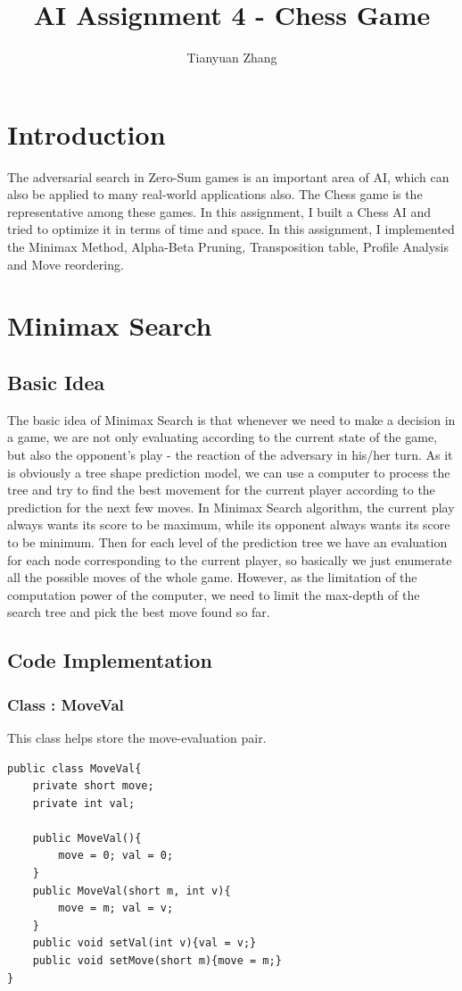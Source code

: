 \documentclass{article}
\title{AI Assignment 4 - Chess Game}
\author{Tianyuan Zhang}
\begin{document}
\maketitle

\section{Introduction}
The adversarial search in Zero-Sum games is an important area of AI, which can also be applied to many real-world applications also. The Chess game is the representative among these games. In this assignment, I built a Chess AI and tried to optimize it in terms of time and space. In this assignment, I implemented the Minimax Method, Alpha-Beta Pruning, Transposition table, Profile Analysis and Move reordering.

\section{Minimax Search}
\subsection{Basic Idea}
The basic idea of Minimax Search is that whenever we need to make a decision in a game, we are not only evaluating according to the current state of the game, but also the opponent's play - the reaction of the adversary in his/her turn. As it is obviously a tree shape prediction model, we can use a computer to process the tree and try to find the best movement for the current player according to the prediction for the next few moves. In Minimax Search algorithm, the current play always wants its score to be maximum, while its opponent always wants its score to be minimum. Then for each level of the prediction tree we have an evaluation for each node corresponding to the current player, so basically we just enumerate all the possible moves of the whole game. However, as the limitation of the computation power of the computer, we need to limit the max-depth of the search tree and pick the best move found so far.

\subsection{Code Implementation}
\subsubsection{Class : MoveVal}
This class helps store the move-evaluation pair.
\begin{lstlisting}
public class MoveVal{
	private short move;
	private int val;
	
	public MoveVal(){
		move = 0; val = 0;
	}
	public MoveVal(short m, int v){
		move = m; val = v;
	}
	public void setVal(int v){val = v;}
	public void setMove(short m){move = m;}
}
\end{lstlisting}
\end{document}

